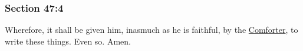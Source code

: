 	\subsubsection{Section 47:4} %
		\label{DC47-4}

		Wherefore, it shall be given him, inasmuch as he is faithful, by the \hyperref[COMFORTER]{Comforter}, to write these things.  Even so.  Amen.

